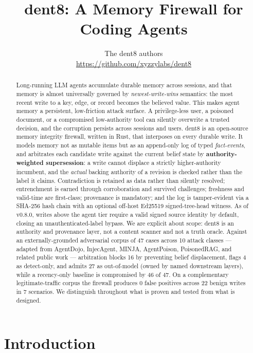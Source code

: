 \documentclass[11pt]{article}
\title{dent8: A Memory Firewall for Coding Agents}
\author{The dent8 authors\\\normalsize\url{https://github.com/xyzzylabs/dent8}}
\date{}
\begin{document}
\maketitle

\begin{abstract}
Long-running LLM agents accumulate durable memory across sessions, and that memory is almost universally governed by \emph{newest-write-wins} semantics: the most recent write to a key, edge, or record becomes the believed value. This makes agent memory a persistent, low-friction attack surface. A privilege-less user, a poisoned document, or a compromised low-authority tool can silently overwrite a trusted decision, and the corruption persists across sessions and users. dent8 is an open-source memory integrity firewall, written in Rust, that interposes on every durable write. It models memory not as mutable items but as an append-only log of typed \emph{fact-events}, and arbitrates each candidate write against the current belief state by \textbf{authority-weighted supersession}: a write cannot displace a strictly higher-authority incumbent, and the \emph{actual} backing authority of a revision is checked rather than the label it claims. Contradiction is retained as data rather than silently resolved; entrenchment is earned through corroboration and survived challenges; freshness and valid-time are first-class; provenance is mandatory; and the log is tamper-evident via a SHA-256 hash chain with an optional off-host Ed25519 signed-tree-head witness. As of v0.8.0, writes above the agent tier require a valid signed source identity by default, closing an unauthenticated-label bypass. We are explicit about scope: dent8 is an authority and provenance layer, not a content scanner and not a truth oracle. Against an externally-grounded adversarial corpus of 47 cases across 10 attack classes --- adapted from AgentDojo, InjecAgent, MINJA, AgentPoison, PoisonedRAG, and related public work --- arbitration blocks 16 by preventing belief displacement, flags 4 as detect-only, and admits 27 as out-of-model (owned by named downstream layers), while a recency-only baseline is compromised by 46 of 47. On a complementary legitimate-traffic corpus the firewall produces 0 false positives across 22 benign writes in 7 scenarios. We distinguish throughout what is proven and tested from what is designed.
\end{abstract}

\section{Introduction}
\end{document}
